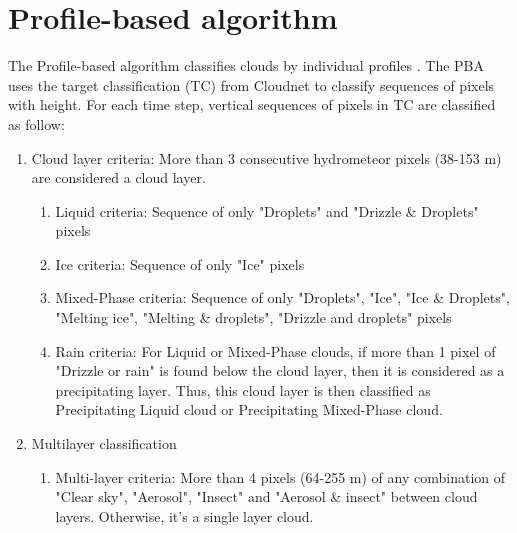 \section{Profile-based algorithm}\label{sec:old_method}

The Profile-based algorithm classifies clouds by individual profiles \citep{pirloagaGroundBasedMeasurementsCloud2022, nomokonovaStatisticsCloudsTheir2019, kneifelMultiyearCloudPrecipitation2022}. The PBA uses the target classification (TC) from Cloudnet to classify sequences of pixels with height. For each time step, vertical sequences of pixels in TC are classified as follow: 

\begin{enumerate}
	
	\item Cloud layer criteria: More than 3 consecutive hydrometeor pixels (38-153 m) \citep{nomokonovaStatisticsCloudsTheir2019} are considered a cloud layer.
	
	\begin{enumerate}
		\item Liquid criteria: Sequence of only "Droplets" and "Drizzle \& Droplets" pixels
		
		\item Ice criteria: Sequence of only "Ice" pixels
		
		\item Mixed-Phase criteria: Sequence of only "Droplets", "Ice", "Ice \& Droplets", "Melting ice", "Melting \& droplets", "Drizzle and droplets" pixels
		
		\item Rain criteria: For Liquid or Mixed-Phase clouds, if more than 1 pixel of "Drizzle or rain" is found below the cloud layer, then it is considered as a precipitating layer. Thus, this cloud layer is then classified as Precipitating Liquid cloud or Precipitating Mixed-Phase cloud.
		
	\end{enumerate}
	
	\item Multilayer classification
	
	\begin{enumerate}
		
		\item Multi-layer criteria: More than 4 pixels (64-255 m) \citep{pirloagaGroundBasedMeasurementsCloud2022} of any combination of "Clear sky", "Aerosol", "Insect" and "Aerosol \& insect" between cloud layers. Otherwise, it's a single layer cloud. 
		
	\end{enumerate}
	
\end{enumerate}

